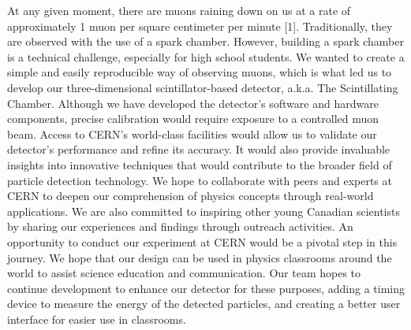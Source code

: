 At any given moment, there are muons raining down on us at a rate of approximately 1 muon per square centimeter per minute [1]. Traditionally, they are observed with the use of a spark chamber. However, building a spark chamber is a technical challenge, especially for high school students. We wanted to create a simple and easily reproducible way of observing muons, which is what led us to develop our three-dimensional scintillator-based detector, a.k.a. The Scintillating Chamber. Although we have developed the detector’s software and hardware components, precise calibration would require exposure to a controlled muon beam. Access to CERN’s world-class facilities would allow us to validate our detector’s performance and refine its accuracy. It would also provide invaluable insights into innovative techniques that would contribute to the broader field of particle detection technology. We hope to collaborate with peers and experts at CERN to deepen our comprehension of physics concepts through real-world applications. We are also committed to inspiring other young Canadian scientists by sharing our experiences and findings through outreach activities. An opportunity to conduct our experiment at CERN would be a pivotal step in this journey. We hope that our design can be used in physics classrooms around the world to assist science education and communication. Our team hopes to continue development to enhance our detector for these purposes, adding a timing device to measure the energy of the detected particles, and creating a better user interface for easier use in classrooms.

